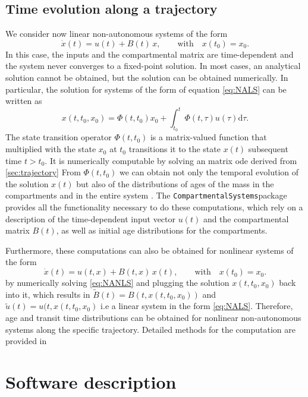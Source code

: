 \documentclass[a4paper]{article}
\newcommand{\CompartmentalSystems}{\texttt{CompartmentalSystems}}
\begin{document}
\subsection{Time evolution along a trajectory} \label{sec:trajectory}
We consider now linear non-autonomous systems of the form
\begin{equation} \label{eq:NALS}
\dot{x}(t) = u(t) + B(t) \, x, \qquad  \mathrm{with} \quad x(t_0) = x_0.
\end{equation}
In this case, the inputs and the compartmental matrix are time-dependent and
the system never converges to a fixed-point solution. In most cases, an
analytical solution cannot be obtained, but the solution can be 
obtained numerically. In particular, the solution for systems of the form of equation \eqref{eq:NALS} can be written as
\begin{equation}
x(t, t_0, x_0) = \Phi(t, t_0) x_0 + \int_{t_0}^{t} \Phi(t, \tau) u(\tau) \mathrm{d}\tau.
\end{equation}
The state transition operator $\Phi(t,t_0)$ is a matrix-valued function that
multiplied with the state $x_0$ at $t_0$ transitions it to the state $x(t)$
subsequent time $t > t_0$. It is numerically computable by solving an matrix
ode derived from \eqref{sec:trajectory} 
From $\Phi(t,t_0)$ we can obtain not only the temporal evolution of the
solution $x(t)$ but also of the distributions of ages of the mass in the compartments and in the entire system \citep{Metzler2018PNAS}.
The \CompartmentalSystems package provides all the functionality necessary to do these computations, which rely on a description of the time-dependent input vector $u(t)$ and the compartmental matrix $B(t)$, as well as initial age distributions for the compartments.

Furthermore, these computations can also be obtained for nonlinear systems of the form
\begin{equation} \label{eq:NANLS}
\dot{x}(t) = u(t, x) + B(t, x) \, x(t), \qquad  \mathrm{with} \quad x(t_0) = x_0.
\end{equation}
by numerically solving \eqref{eq:NANLS} and plugging the solution $x(t, t_0,
x_0)$ back into it, which results in $\tilde{B}(t)=B(t,x(t, t_0,x_0))$ and
$\tilde{u}(t)=u(t,x(t, t_0,x_0)$  i.e a linear system in the form
\eqref{eq:NALS}. 
Therefore,  age and transit time
distributions can be obtained for nonlinear non-autonomous systems along the
specific trajectory. Detailed methods for the computation are provided in
\citet{Metzler2018PNAS}

\section{Software description}
\end{document}
